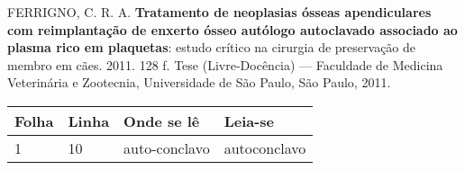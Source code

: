 \begin{errata}
FERRIGNO, C. R. A. \textbf{Tratamento de neoplasias ósseas apendiculares
com reimplantação de enxerto ósseo autólogo autoclavado associado ao plasma
rico em plaquetas}: estudo crítico na cirurgia de preservação de membro em
cães. 2011. 128 f. Tese (Livre-Docência) --- Faculdade de Medicina
Veterinária
e Zootecnia, Universidade de São Paulo, São Paulo, 2011.
\begin{table}[htb]
\center{}
\footnotesize{}
\begin{tabular}{p{1.4cm} p{1cm} p{3cm} p{3cm}}
\toprule{}
\textbf{Folha} & \textbf{Linha} & \textbf{Onde se lê} &
\textbf{Leia-se}\\
\midrule
1 & 10 & auto-conclavo & autoconclavo\\
\bottomrule
\end{tabular}
\end{table}
\end{errata}
\cleardoublepage{}
